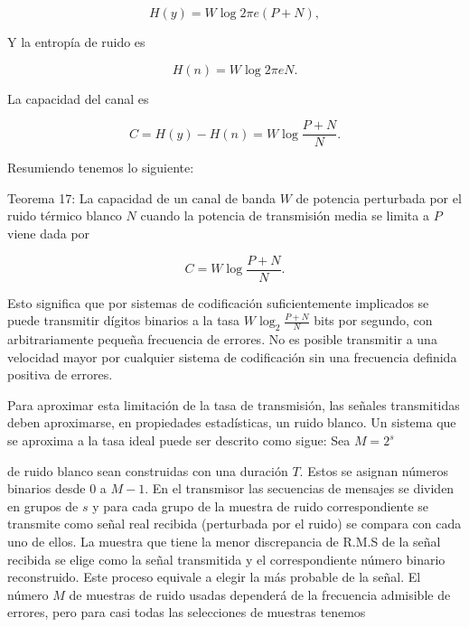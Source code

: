 	\begin{equation}
		H(y) = W\log 2\pi e(P+N),
	\end{equation}
	
	Y la entrop\'ia de ruido es
	
	\begin{equation}
		H(n) = W\log 2\pi eN.
	\end{equation}
	
	La capacidad del canal es
	
	\begin{equation}
		C = H(y) - H(n) = W\log \frac{P + N}{N}.
	\end{equation}
	
	Resumiendo tenemos lo siguiente:
	
	Teorema 17: La capacidad de un canal de banda $W$ de potencia perturbada por el ruido
	t\'ermico blanco $N$ cuando la potencia de transmisi\'on media se limita a $P$ viene
	dada por
	
	\begin{equation}
		C = W\log \frac{P + N}{N}.
	\end{equation}
	
	Esto significa que por sistemas de codificaci\'on suficientemente implicados se puede
	transmitir d\'igitos binarios a la tasa $W \log_{2}\frac{P + N}{N}$ bits por segundo,
	con arbitrariamente peque\~na frecuencia de errores. No es posible transmitir a una
	velocidad mayor por cualquier sistema de codificaci\'on sin una frecuencia
	definida positiva de errores.
	
	Para aproximar esta limitaci\'on de la tasa de transmisi\'on, las se\~nales transmitidas
	deben aproximarse, en propiedades estad\'isticas, un ruido blanco. Un sistema que se 
	aproxima a la tasa ideal puede ser descrito como sigue: Sea $M = 2^s$
	
	de ruido blanco sean construidas con una duración $T$. Estos se asignan n\'umeros 
	binarios desde 0 a  $M-1$. En el transmisor las secuencias de mensajes se dividen en 
	grupos de $s$ y para cada grupo de la muestra de ruido correspondiente se transmite
	como se\~nal real recibida (perturbada por el ruido) se compara con cada uno de ellos.
	La muestra que tiene la menor discrepancia de R.M.S de la se\~nal recibida se elige
	como la se\~nal transmitida y el correspondiente n\'umero binario reconstruido.
	Este proceso equivale a elegir la m\'as probable de la se\~nal.
	El n\'umero $M$ de muestras de ruido usadas depender\'a de la frecuencia
	admisible de errores, pero para casi todas las selecciones de muestras tenemos	
	
